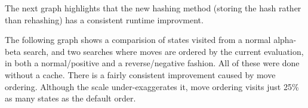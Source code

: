 \documentclass[12pt]{article}
\begin{document}
The next graph highlights that the new hashing method (storing the hash rather than rehashing) has a consistent runtime improvment.

\begin{center}
\end{center}

The following graph shows a comparision of states visited from a normal alpha-beta search, and two searches where moves are ordered by the current evaluation, in both a normal/positive and a reverse/negative fashion. All of these were done without a cache. There is a fairly consistent improvement caused by move ordering. Although the scale under-exaggerates it, move ordering visits just 25\% as many states as the default order.
\end{document}
